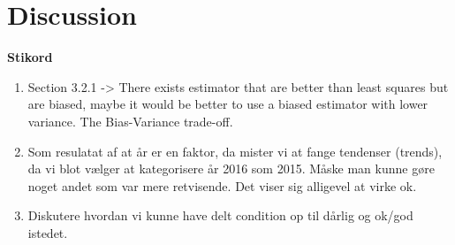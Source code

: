 \chapter{Discussion}

\textbf{Stikord}
\begin{enumerate}
    \item Section 3.2.1 -> There exists estimator that are better than least squares but are biased, maybe it would be better to use a biased estimator with lower variance. The Bias-Variance trade-off. 
    \item Som resulatat af at år er en faktor, da mister vi at fange tendenser (trends), da vi blot vælger at kategorisere år 2016 som 2015. Måske man kunne gøre noget andet som var mere retvisende. Det viser sig alligevel at virke ok.
    \item Diskutere hvordan vi kunne have delt condition op til dårlig og ok/god istedet.
\end{enumerate}